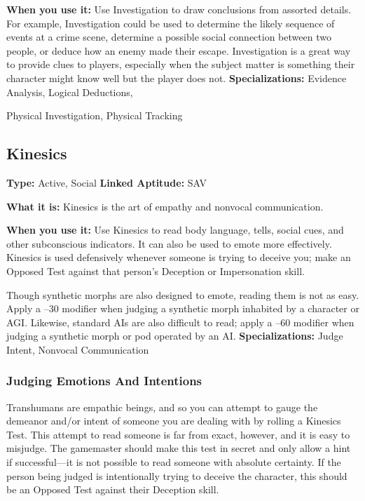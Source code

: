 \textbf{When you use it:} Use Investigation to draw conclusions
from assorted details. For example, Investigation
could be used to determine the likely sequence
of events at a crime scene, determine a possible social 
connection between two people, or deduce how an 
enemy made their escape. Investigation is a great way 
to provide clues to players, especially when the subject 
matter is something their character might know well 
but the player does not.
\textbf{Specializations:} Evidence Analysis, Logical Deductions, 

Physical Investigation, Physical Tracking

\subsection{Kinesics}

\textbf{Type:} Active, Social
\textbf{Linked Aptitude:} SAV

\textbf{What it is:} Kinesics is the art of empathy and nonvocal
communication.

\textbf{When you use it:} Use Kinesics to read body language, 
tells, social cues, and other subconscious indicators. It 
can also be used to emote more effectively. Kinesics 
is used defensively whenever someone is trying to deceive
you; make an Opposed Test against that person's
Deception or Impersonation skill.

Though synthetic morphs are also designed to 
emote, reading them is not as easy. Apply a –30 modifier
when judging a synthetic morph inhabited by a
character or AGI. Likewise, standard AIs are also difficult
to read; apply a –60 modifier when judging a
synthetic morph or pod operated by an AI.
\textbf{Specializations:} Judge Intent, Nonvocal Communication

\subsubsection{Judging Emotions And Intentions}

Transhumans are empathic beings, and so you can 
attempt to gauge the demeanor and/or intent of 
someone you are dealing with by rolling a Kinesics 
Test. This attempt to read someone is far from exact, 
however, and it is easy to misjudge. The gamemaster 
should make this test in secret and only allow a hint 
if successful—it is not possible to read someone with 
absolute certainty. If the person being judged is intentionally
trying to deceive the character, this should be
an Opposed Test against their Deception skill.

